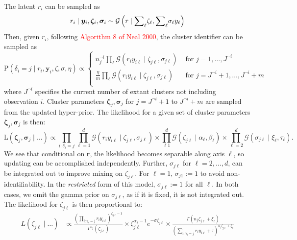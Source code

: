 \documentclass[10pt]{article}
\newcommand{\makenote}[1]{\textcolor{red}{#1}} %
\begin{document}
    The latent $r_i$ can be sampled as
\begin{equation*}
    r_i \mid \bm{y}_i,\bm{\zeta}_i,\bm{\sigma}_i\sim \mathcal{G}\left(r\mid{\small \sum}_{\ell}\zeta_\ell,{\small\sum}_{\ell} \sigma_{\ell}y_{\ell}\right)
\end{equation*}
Then, given $r_i$, following \makenote{Algorithm 8 of Neal 2000}, the cluster identifier can be sampled as
\begin{equation*}
    \text{P}(\delta_i = j \mid r_i, \bm{y}_i, \zeta, \sigma, \eta) \propto \begin{cases}
    n_j^{\neg i}\prod_{\ell}\mathcal{G}\left(r_i y_{i\ell}\mid\zeta_{j\ell},\sigma_{j\ell}\right) &\text{ for }j = 1,\ldots, J^{\neg i} \\
    \frac{\eta}{m}\prod_{\ell}\mathcal{G}\left(r_i y_{i\ell}\mid\zeta_{j\ell},\sigma_{j\ell}\right) &\text{ for }j = J^{\neg i} + 1,\ldots, J^{\neg i} + m\\
    \end{cases}
\end{equation*}
where $J^{\neg i}$ specifies the current number of extant clusters not including observation $i$.  Cluster
    parameters $\bm{\zeta}_j,\bm{\sigma}_j$ for $j = J^{\neg i} + 1$ to $J^{\neg i} + m$ are sampled from
    the updated hyper-prior.  The likelihood for a given set of cluster parameters 
    $\bm{\zeta}_j,\bm{\sigma}_j$ is then:
\begin{equation*}
    \text{L}\left(\bm{\zeta}_j,\bm{\sigma}_j\mid\ldots\right) \propto \prod_{i:\delta_i = j}\prod_{\ell = 1}^d\mathcal{G}\left(r_i y_{i\ell}\mid\zeta_{j\ell},\sigma_{j\ell}\right)\times \prod_{\ell  1}^d\mathcal{G}\left(\zeta_{j\ell}\mid \alpha_{\ell},\beta_{\ell}\right)\times\prod_{\ell = 2}^d\mathcal{G}\left(\sigma_{j\ell}\mid\xi_{\ell},\tau_{\ell}\right).
\end{equation*}
We see that conditional on $\bm{r}$, the likelihood becomes separable along axis $\ell$, so updating can
    be accomplished independently.  Further, $\sigma_{j\ell}$ for $\ell = 2,\ldots, d$, can be integrated 
    out to improve mixing on $\zeta_{j\ell}$. For $\ell = 1$, $\sigma_{j1} := 1$ to avoid non-identifiability.
    In the \emph{restricted} form of this model, $\sigma_{j\ell} := 1$ for all $\ell$.  In both cases, we 
    omit the gamma prior on $\sigma_{j\ell}$, as if it is fixed, it is not integrated out.  The likelihood 
    for $\zeta_{j\ell}$ is then proportional to:
\begin{equation*}
    \begin{aligned}
    L(\zeta_{j\ell}\mid\ldots) &\propto \frac{\left(\prod_{i:\gamma_i = j}r_i y_{i\ell}\right)^{\zeta_{j\ell} - 1}}{\Gamma^{n_j}(\zeta_{j\ell})}\times \zeta_{j\ell}^{\alpha_{\ell} - 1}e^{-\sigma\zeta_{j\ell}}\times\frac{\Gamma(n_j\zeta_{j\ell} + \xi_{\ell})}{\left(\sum_{i:\gamma_i = j}r_iy_{i\ell} + \tau\right)^{n_j\zeta_{j\ell} + \xi_{\ell}}}
    \end{aligned}
\end{equation*}
\end{document}
